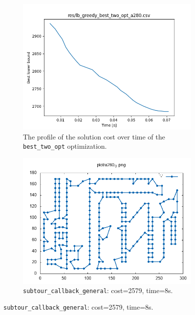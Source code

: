 \begin{figure}[!h]
\begin{subfigure}{.5\columnwidth}
		\includegraphics[width=\columnwidth]{../res/lb_greedy_best_two_opt_a280.png}
		\caption{The profile of the solution cost over time of the \texttt{best\_two\_opt} optimization.}
		\label{fig:lb_greedy_best_two_opt_a280}
	\end{subfigure}
	\begin{subfigure}{.5\columnwidth}
		\centering
		\includegraphics[width=\columnwidth]{../res/a280_0.png}
		\caption{\texttt{subtour\_callback\_general}: cost=2579, time=8s.}
		\label{fig:a280_0}
	\end{subfigure}
\end{figure}


